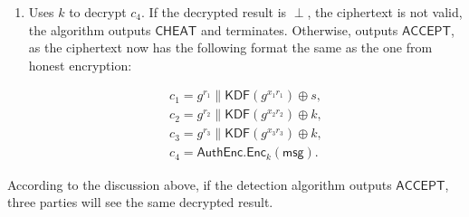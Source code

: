 \documentclass{article}
\begin{document}
\begin{enumerate}
    \item Uses $k$ to decrypt $c_4$. If the decrypted result is $\perp$, the ciphertext is not valid, the algorithm outputs $\mathsf{CHEAT}$ and terminates. Otherwise, outputs $\mathsf{ACCEPT}$, as the ciphertext now has the following format the same as the one from honest encryption:
    
    \[
    \begin{array}{l}
    c_1=g^{r_1}\parallel\mathsf{KDF}(g^{x_1r_1})\oplus s,\\
    c_2=g^{r_2}\parallel\mathsf{KDF}(g^{x_2r_2})\oplus k,\\
    c_3=g^{r_3}\parallel\mathsf{KDF}(g^{x_3r_3})\oplus k,\\
    c_4=\mathsf{AuthEnc}.\boxed{\mathsf{Enc}_{k}}(\mathsf{msg}).
    \end{array}
    \]
\end{enumerate}
According to the discussion above, if the detection algorithm outputs $\mathsf{ACCEPT}$, three parties will see the same decrypted result. 
    
\end{document}
